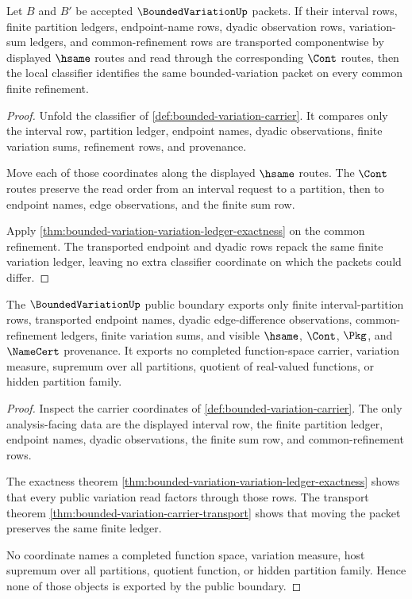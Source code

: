 \begin{theorem}
\label{thm:bounded-variation-carrier-transport}
Let $B$ and $B'$ be accepted $\BoundedVariationUp$ packets. If their interval rows, finite partition ledgers, endpoint-name rows, dyadic observation rows, variation-sum ledgers, and common-refinement rows are transported componentwise by displayed $\hsame$ routes and read through the corresponding $\Cont$ routes, then the local classifier identifies the same bounded-variation packet on every common finite refinement.
\end{theorem}
\begin{proof}
Unfold the classifier of \autoref{def:bounded-variation-carrier}. It compares only the interval row, partition ledger, endpoint names, dyadic observations, finite variation sums, refinement rows, and provenance.

Move each of those coordinates along the displayed $\hsame$ routes. The $\Cont$ routes preserve the read order from an interval request to a partition, then to endpoint names, edge observations, and the finite sum row.

Apply \autoref{thm:bounded-variation-variation-ledger-exactness} on the common refinement. The transported endpoint and dyadic rows repack the same finite variation ledger, leaving no extra classifier coordinate on which the packets could differ.
\end{proof}

\begin{theorem}
\label{thm:bounded-variation-no-escape-boundary}
The $\BoundedVariationUp$ public boundary exports only finite interval-partition rows, transported endpoint names, dyadic edge-difference observations, common-refinement ledgers, finite variation sums, and visible $\hsame$, $\Cont$, $\Pkg$, and $\NameCert$ provenance. It exports no completed function-space carrier, variation measure, supremum over all partitions, quotient of real-valued functions, or hidden partition family.
\end{theorem}
\begin{proof}
Inspect the carrier coordinates of \autoref{def:bounded-variation-carrier}. The only analysis-facing data are the displayed interval row, the finite partition ledger, endpoint names, dyadic observations, the finite sum row, and common-refinement rows.

The exactness theorem \autoref{thm:bounded-variation-variation-ledger-exactness} shows that every public variation read factors through those rows. The transport theorem \autoref{thm:bounded-variation-carrier-transport} shows that moving the packet preserves the same finite ledger.

No coordinate names a completed function space, variation measure, host supremum over all partitions, quotient function, or hidden partition family. Hence none of those objects is exported by the public boundary.
\end{proof}

